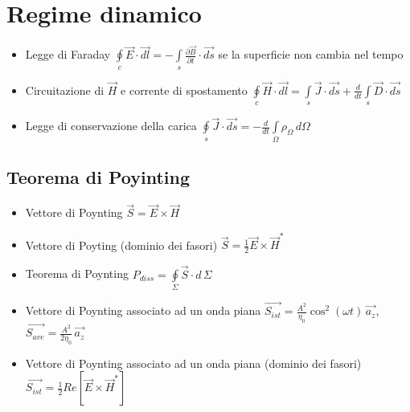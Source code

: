 \documentclass{article}
\begin{document}
\section{Regime dinamico}
\begin{itemize}
	\item Legge di Faraday \(\oint\limits_c \vec{E} \cdot \vec{dl} = - \int\limits_s \frac{\partial \vec{B}}{\partial t} \cdot \vec{ds} \) se la superficie non cambia nel tempo
	\item Circuitazione di \( \vec{H} \) e corrente di spostamento \( \oint\limits_c \vec{H} \cdot \vec{dl} = \int\limits_s \vec{J} \cdot \vec{ds} + \frac{d}{dt} \int\limits_s \vec{D} \cdot \vec{ds} \)
	\item Legge di conservazione della carica \( \oint\limits_s \vec{J} \cdot \vec{ds} = -\frac{d}{dt} \int\limits_\Omega \rho_\Omega \, d\Omega \)
	\end{itemize}
	
\subsection{Teorema di Poyinting}
\begin{itemize}
	\item Vettore di Poynting \( \vec{S} = \vec{E} \times \vec{H} \)
	\item Vettore di Poyting (dominio dei fasori) \( \vec{S} = \frac{1}{2} \vec{E} \times \vec{H}^{*} \)
	\item Teorema di Poynting \( P_{diss} = \oint\limits_\Sigma \vec{S} \cdot d \,\Sigma \)
	\item Vettore di Poynting associato ad un onda piana \( \vec{S_{ist}} = \frac{A^2}{\eta_0} \cos^2{(\omega t)} \, \vec{a_z} \), \( \vec{S_{ave}} = \frac{A^2}{2 \eta_0} \, \vec{a_z}\)
	\item Vettore di Poynting associato ad un onda piana (dominio dei fasori) \( \vec{S_{ist}} = \frac{1}{2} Re[\vec{E} \times \vec{H}^{*}] \)
\end{itemize}
\end{document}
